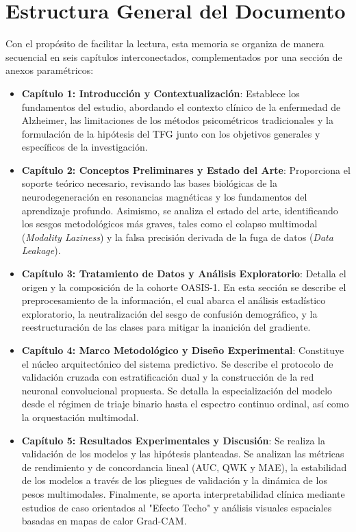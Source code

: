 \documentclass[12pt, oneside, english, spanish]{book}
\begin{document}
\section{Estructura General del Documento} \label{subsec:estructura_documento}

Con el propósito de facilitar la lectura, esta memoria se organiza de manera secuencial en seis capítulos interconectados, complementados por una sección de anexos paramétricos:

\begin{itemize}
	\item \textbf{Capítulo 1: Introducción y Contextualización}: Establece los fundamentos del estudio, abordando el contexto clínico de la enfermedad de Alzheimer, las limitaciones de los métodos psicométricos tradicionales y la formulación de la hipótesis del TFG junto con los objetivos generales y específicos de la investigación.
	
	\item \textbf{Capítulo 2: Conceptos Preliminares y Estado del Arte}: Proporciona el soporte teórico necesario, revisando las bases biológicas de la neurodegeneración en resonancias magnéticas y los fundamentos del aprendizaje profundo. Asimismo, se analiza el estado del arte, identificando los sesgos metodológicos más graves, tales como el colapso multimodal (\textit{Modality Laziness}) y la falsa precisión derivada de la fuga de datos (\textit{Data Leakage}).
	
	\item \textbf{Capítulo 3: Tratamiento de Datos y Análisis Exploratorio}: Detalla el origen y la composición de la cohorte OASIS-1. En esta sección se describe el preprocesamiento de la información, el cual abarca el análisis estadístico exploratorio, la neutralización del sesgo de confusión demográfico, y la reestructuración de las clases para mitigar la inanición del gradiente.
	
	\item \textbf{Capítulo 4: Marco Metodológico y Diseño Experimental}: Constituye el núcleo arquitectónico del sistema predictivo. Se describe el protocolo de validación cruzada con estratificación dual y la construcción de la red neuronal convolucional propuesta. Se detalla la especialización del modelo desde el régimen de triaje binario hasta el espectro continuo ordinal, así como la orquestación multimodal.
	
	\item \textbf{Capítulo 5: Resultados Experimentales y Discusión}: Se realiza la validación de los modelos y las hipótesis planteadas. Se analizan las métricas de rendimiento y de concordancia lineal (AUC, QWK y MAE), la estabilidad de los modelos a través de los pliegues de validación y la dinámica de los pesos multimodales. Finalmente, se aporta interpretabilidad clínica mediante estudios de caso orientados al "Efecto Techo" y análisis visuales espaciales basadas en mapas de calor Grad-CAM.
	

\end{itemize}
\end{document}
